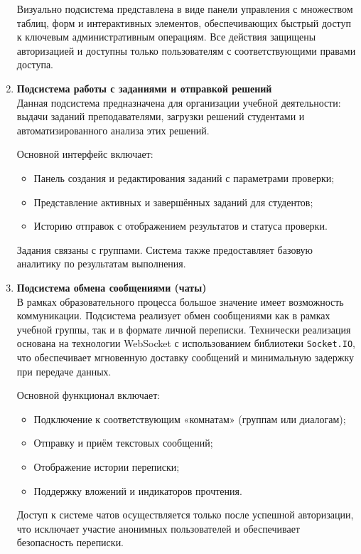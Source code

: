 \begin{enumerate}
  Визуально подсистема представлена в виде панели управления с множеством таблиц, форм и интерактивных элементов, обеспечивающих быстрый доступ к ключевым административным операциям. Все действия защищены авторизацией и доступны только пользователям с соответствующими правами доступа.

  \item \textbf{Подсистема работы с заданиями и отправкой решений}\\
  Данная подсистема предназначена для организации учебной деятельности: выдачи заданий преподавателями, загрузки решений студентами и автоматизированного анализа этих решений. 
  
  Основной интерфейс включает:
  \begin{itemize}
    \item Панель создания и редактирования заданий с параметрами проверки;
    \item Представление активных и завершённых заданий для студентов;
    \item Историю отправок с отображением результатов и статуса проверки.
  \end{itemize}
  
  Задания связаны с группами. Система также предоставляет базовую аналитику по результатам выполнения.

  \item \textbf{Подсистема обмена сообщениями (чаты)}\\ 
  В рамках образовательного процесса большое значение имеет возможность коммуникации. Подсистема реализует обмен сообщениями как в рамках учебной группы, так и в формате личной переписки.  
  Технически реализация основана на технологии WebSocket с использованием библиотеки \texttt{Socket.IO}, что обеспечивает мгновенную доставку сообщений и минимальную задержку при передаче данных. 
  
  Основной функционал включает:
  \begin{itemize}
    \item Подключение к соответствующим «комнатам» (группам или диалогам);
    \item Отправку и приём текстовых сообщений;
    \item Отображение истории переписки;
    \item Поддержку вложений и индикаторов прочтения.
  \end{itemize}
  
  Доступ к системе чатов осуществляется только после успешной авторизации, что исключает участие анонимных пользователей и обеспечивает безопасность переписки.


\end{enumerate}
